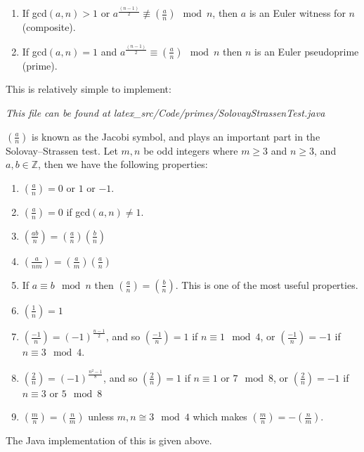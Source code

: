     \begin{enumerate}
      \item If gcd$(a,n) > 1$ or $a^{\frac{(n-1)}{2}} \not\equiv (\frac{a}{n}) \mod{n}$, then $a$ is an Euler witness for $n$ (composite).
      \item If gcd$(a,n) = 1$ and $a^{\frac{(n-1)}{2}} \equiv (\frac{a}{n}) \mod{n}$ then $n$ is an Euler pseudoprime (prime).
    \end{enumerate}
    
    This is relatively simple to implement:
    
    
    \emph{This file can be found at latex\_src/Code/primes/SolovayStrassenTest.java} \\
    
    \begin{mathdef}
      $(\frac{a}{n})$ is known as the Jacobi symbol, and plays an important part in the Solovay--Strassen test. Let $m,n$ be odd integers where $m \geq 3$ and $n \geq 3$, and $a,b \in \mathbb{Z}$, then we have the following properties\cite{Alfred-Menezes:1996kx}:
    
      \begin{enumerate}
        \item $(\frac{a}{n}) = 0$ or $1$ or $-1$.
        \item $(\frac{a}{n}) = 0$ if gcd$(a,n) \neq 1$.
        \item $(\frac{ab}{n}) = (\frac{a}{n}) (\frac{b}{n})$
        \item $(\frac{a}{nm}) = (\frac{a}{m}) (\frac{a}{n})$
        \item If $a \equiv b \mod{n}$ then $(\frac{a}{n}) = (\frac{b}{n})$. This is one of the most useful properties.
        \item $(\frac{1}{n}) = 1$
        \item $(\frac{-1}{n}) = (-1)^{\frac{n-1}{2}}$, and so $(\frac{-1}{n}) = 1$ if $n \equiv 1 \mod{4}$, or $(\frac{-1}{n}) = -1$ if $n \equiv 3 \mod{4}$.
        \item $(\frac{2}{n}) = (-1)^{\frac{n^2-1}{8}}$, and so $(\frac{2}{n}) = 1$ if $n \equiv 1 $ or $ 7 \mod{8}$, or $(\frac{2}{n}) = -1$ if $n \equiv 3 $ or $ 5 \mod{8}$
        \item $(\frac{m}{n}) = (\frac{n}{m})$ unless $m,n \cong 3 \mod{4}$ which makes $(\frac{m}{n}) = -(\frac{n}{m})$.
      \end{enumerate}
    
      The Java implementation of this is given above.
    \end{mathdef}
    
